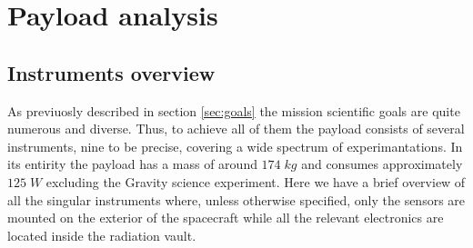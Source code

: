 \section{Payload analysis}
\label{sec:payload}

\subsection{Instruments overview}
As previuosly described in section \ref{sec:goals} the mission scientific goals are quite numerous and diverse. Thus, to achieve all of them the payload consists of several instruments, nine to be precise, covering a wide spectrum of experimantations. In its entirity the payload has a mass of around $174 \;kg$ and consumes approximately $125 \;W$ excluding the Gravity science experiment. %
Here we have a brief overview of all the singular instruments where, unless otherwise specified, only the sensors are mounted on the exterior of the spacecraft while all the relevant electronics are located inside the radiation vault. 

